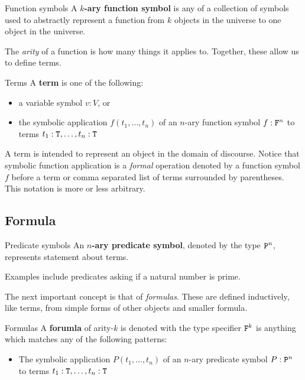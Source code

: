 \begin{definition}{Function symbols}{}
	A {\bf $k$-ary function symbol} is any of a collection of symbols used to abstractly represent a function from $k$ objects in the universe to one object in the universe.
\end{definition}

\noindent
The \emph{arity} of a function is how many things it applies to.
Together, these allow us to define terms.

\begin{definition}{Terms}{}
	A {\bf term} is one of the following:
	\begin{itemize}[noitemsep,topsep=0pt]
		\item a variable symbol $v:V$, or
		\item the symbolic application $f(t_1,\ldots,t_n)$ of an $n$-ary function symbol $f:\texttt{F}^n$ to terms $t_1:\texttt{T},\ldots,t_n:\texttt{T}$
	\end{itemize}
\end{definition}

\noindent
A term is intended to represent an object in the domain of discourse.
Notice that symbolic function application is a \emph{formal} operation denoted by a function symbol $f$ before a term or comma separated list of terms surrounded by parentheses.
This notation is more or less arbitrary.

\subsection{Formula}

\begin{definition}{Predicate symbols}{}
	An {\bf $n$-ary predicate symbol}, denoted by the type $\texttt{P}^n$, represents  statement about terms.
\end{definition}

\noindent
Examples include predicates asking if a natural number is prime.

The next important concept is that of \emph{formulas}.
These are defined inductively, like terms, from simple forms of other objects and smaller formula.

\begin{definition}{Formulas}{}
	A {\bf forumla} of arity-$k$ is denoted with the type specifier $\texttt{F}^k$ is anything which matches any of the following patterns:
	\begin{itemize}[itemsep=0pt]
		\item The symbolic application $P(t_1,\ldots,t_n)$ of an $n$-ary predicate symbol $P:\texttt{P}^n$ to terms $t_1:\texttt{T},\ldots,t_n:\texttt{T}$
	\end{itemize}
\end{definition}



